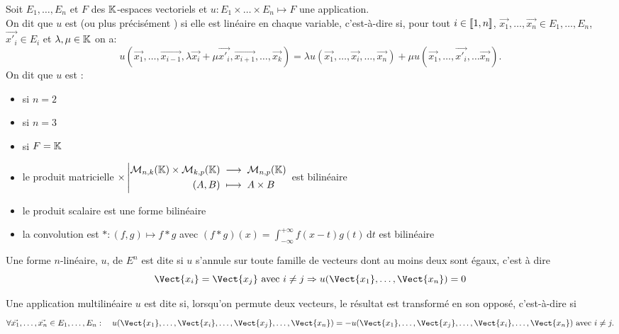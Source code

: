 \documentclass{book}
\begin{document}
\begin{Definition}
Soit $E_1,\dots ,E_n$ et $F$ des $\mathbb{K}$-espaces vectoriels et $u : E_1 \times \dots \times E_n \mapsto F$ une
application.\\
On dit que $u$ est   (ou plus précisément  )  si  elle est linéaire en chaque variable,  c'est-à-dire si, pour tout $i\in\mathopen\lbrack\!\lbrack1,n \mathclose\rbrack\!\rbrack$, $\vec{x_1},\dots,\vec{x_n}\in E_1,\dots ,E_n$, $\vec{x'_i} \in E_i$ et $\lambda,\mu\in\mathbb{K} $ on a: 
$$ u(\vec{x_{1}},\dots ,\vec{x_{i-1}},\lambda \vec{x_{i}}+\mu \vec{x'_{i}},\vec{x_{i+1}},\dots ,\vec{x_{k}})=\lambda u(\vec{x_{1}},\dots ,\vec{x_{i}},\dots ,\vec{x_{n}})+\mu u(\vec{x_{1}},\dots ,\vec{x'_{i}},\dots \vec{x_{n}}).$$
On dit que $u$ est :
\begin{itemize}
\item {} si  $n = 2$
\item {} si  $n = 3$
\item {} si  $F = \mathbb{K}$
\end{itemize}
\end{Definition}
\begin{Exemple}
\begin{itemize}
\item le produit matricielle ${\times}\left|\begin{aligned}{\mathcal{M}_{n,k}(\mathbb{K})\times \mathcal{M}_{k,p}(\mathbb{K}) }&\;\longrightarrow\;{\mathcal{M}_{n,p}(\mathbb{K})}\\{(A,B)}&\;\longmapsto\;{A\times B}\end{aligned}\right.$ est bilinéaire
\item le produit scalaire  est une forme bilinéaire
\item la convolution est  $\ast : (f,g)\mapsto f\ast g$ avec $(f\ast g)(x)= \int _{-\infty }^{+\infty }f(x-t)g(t)\,\mathrm {d} t$ est bilinéaire
\end{itemize}
\end{Exemple}
\begin{Definition}
Une forme $n$-linéaire, $u$, de $E^n$ est dite  si $u$ s'annule sur toute famille de vecteurs dont au moins deux sont égaux, c'est à dire
 $$\Vect{x_i}=\Vect{x_j} \text{ avec } i\neq j \Rightarrow u(\Vect{x_1},\dots,\Vect{x_n})=0$$
\end{Definition}
\begin{Definition}
Une application multilinéaire $u$ est dite  si, lorsqu'on permute deux vecteurs, le résultat est transformé en son opposé, c'est-à-dire si
 $$\forall \vec{x_1},\dots,\vec{x_n}\in E_1,\dots ,E_n:\quad  u(\Vect{x_1},\dots ,\Vect{x_i},\dots ,\Vect{x_j},\dots ,\Vect{x_n})=-u(\Vect{x_1},\dots ,\Vect{x_j},\dots ,\Vect{x_i},\dots ,\Vect{x_n})\text{ avec }i\neq j.$$
\end{Definition}
\end{document}
